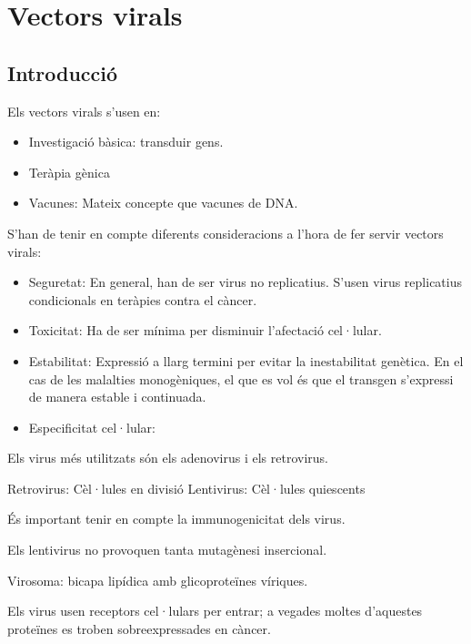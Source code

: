 \section{Vectors virals}
\label{sec:vectors-virals}

\subsection{Introducció}
\label{sec:introduccio}

Els vectors virals s'usen en:
\begin{itemize}
\item Investigació bàsica: transduir gens.
\item Teràpia gènica
\item Vacunes: Mateix concepte que vacunes de DNA.
\end{itemize}

S'han de tenir en compte diferents consideracions a l'hora de fer servir vectors virals:
\begin{itemize}
\item Seguretat: En general, han de ser virus no replicatius. S'usen virus replicatius condicionals en teràpies contra el càncer.
\item Toxicitat: Ha de ser mínima per disminuir l'afectació cel·lular.
\item Estabilitat: Expressió a llarg termini per evitar la inestabilitat genètica. En el cas de les malalties monogèniques, el que es vol és que el transgen s'expressi de manera estable i continuada.
\item Especificitat cel·lular:
\end{itemize}

Els virus més utilitzats són els adenovirus i els retrovirus.


Retrovirus: Cèl·lules en divisió
Lentivirus: Cèl·lules quiescents

És important tenir en compte la immunogenicitat dels virus.

Els lentivirus no provoquen tanta mutagènesi insercional. 

Virosoma: bicapa lipídica amb glicoproteïnes víriques.

Els virus usen receptors cel·lulars per entrar; a vegades moltes d'aquestes proteïnes es troben sobreexpressades en càncer.

